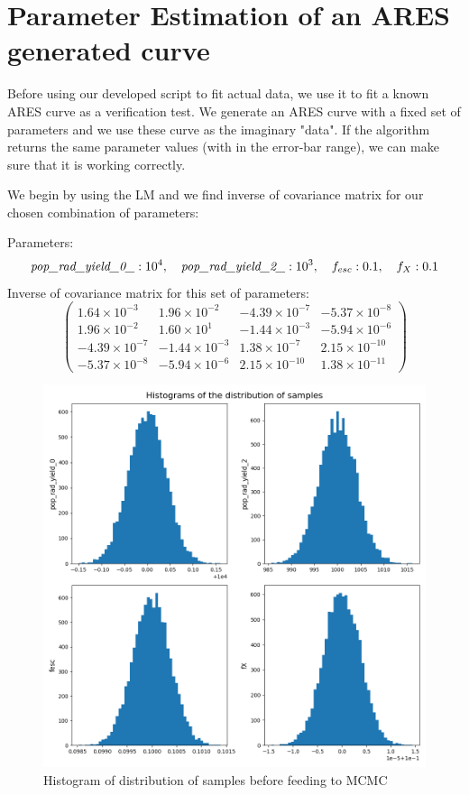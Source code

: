 \documentclass[12pt, TexShade, letterpaper]{report}
\begin{document}
\section{Parameter Estimation of an ARES generated curve}
Before using our developed script to fit actual data, we use it to fit a known ARES curve as a verification test. We generate an ARES curve with a fixed set of parameters and we use these curve as the imaginary "data". If the algorithm returns the same parameter values (with in the error-bar range), we can make sure that it is working correctly.\par
We begin by using the LM and we find inverse of covariance matrix for our chosen combination of parameters:\par
Parameters:
\begin{equation}
\emph{pop\_rad\_yield\_0\_}: 10^4, \quad \emph{pop\_rad\_yield\_2\_}: 10^3,\quad f_{esc}: 0.1,\quad f_X: 0.1 
\end{equation}
Inverse of covariance matrix for this set of parameters:
\begin{equation}
    \begin{pmatrix}
    1.64\times 10^{-3} & 1.96 \times 10^{-2} &  -4.39 \times 10^{-7} &  -5.37 \times 10^{-8} \\
    1.96 \times 10^{-2} &  1.60 \times 10^{1} &  -1.44 \times 10^{-3} &  -5.94 \times 10^{-6} \\
    -4.39 \times 10^{-7} &  -1.44 \times 10^{-3} &  1.38 \times 10^{-7} &  2.15 \times 10^{-10} \\
    -5.37 \times 10^{-8} &  -5.94 \times 10^{-6} &  2.15 \times 10^{-10} &  1.38 \times 10^{-11} 
    \end{pmatrix}
\end{equation}
\begin{figure}[h!]
\centering
\includegraphics[scale =0.6]{histograms_known_curve.png}
\caption[Histogram of distribution of samples]{Histogram of distribution of samples before feeding to MCMC}
\label{fig:histogram_samples_known_curve}
\end{figure}
\end{document}
